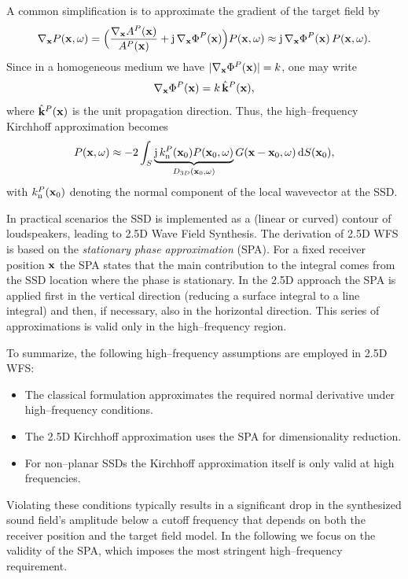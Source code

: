 \documentclass[11pt]{article}
\begin{document}
A common simplification is to approximate the gradient of the target field by
\begin{equation}
    \nabla_{\mathbf{x}}P(\mathbf{x},\omega) 
    = \Bigl(\frac{\nabla_{\mathbf{x}}A^P(\mathbf{x})}{A^P(\mathbf{x})} + \mathrm{j}\,\nabla_{\mathbf{x}}\Phi^P(\mathbf{x})\Bigr) P(\mathbf{x},\omega)
    \approx \mathrm{j}\,\nabla_{\mathbf{x}}\Phi^P(\mathbf{x})\,P(\mathbf{x},\omega).
\end{equation}
Since in a homogeneous medium we have \(|\nabla_{\mathbf{x}}\Phi^P(\mathbf{x})|=k\), one may write
\[
\nabla_{\mathbf{x}}\Phi^P(\mathbf{x})= k\,\hat{\mathbf{k}}^P(\mathbf{x}),
\]
where \(\hat{\mathbf{k}}^P(\mathbf{x})\) is the unit propagation direction. Thus, the high–frequency Kirchhoff approximation becomes
\begin{equation}
    P(\mathbf{x},\omega) \approx -2\int_S \underbrace{\mathrm{j}\,k^P_{\mathrm{n}}(\mathbf{x}_0)P(\mathbf{x}_0,\omega)}_{D_{3D}(\mathbf{x}_0,\omega)} G(\mathbf{x}-\mathbf{x}_0,\omega)\,\mathrm{d} S(\mathbf{x}_0),
\end{equation}
with \(k^P_{\mathrm{n}}(\mathbf{x}_0)\) denoting the normal component of the local wavevector at the SSD.

In practical scenarios the SSD is implemented as a (linear or curved) contour of loudspeakers, leading to 2.5D Wave Field Synthesis. The derivation of 2.5D WFS is based on the \emph{stationary phase approximation} (SPA). For a fixed receiver position \(\mathbf{x}\) the SPA states that the main contribution to the integral comes from the SSD location where the phase is stationary. In the 2.5D approach the SPA is applied first in the vertical direction (reducing a surface integral to a line integral) and then, if necessary, also in the horizontal direction. This series of approximations is valid only in the high–frequency region.

To summarize, the following high–frequency assumptions are employed in 2.5D WFS:
\begin{itemize}
    \item The classical formulation approximates the required normal derivative under high–frequency conditions.
    \item The 2.5D Kirchhoff approximation uses the SPA for dimensionality reduction.
    \item For non–planar SSDs the Kirchhoff approximation itself is only valid at high frequencies.
\end{itemize}
Violating these conditions typically results in a significant drop in the synthesized sound field’s amplitude below a cutoff frequency that depends on both the receiver position and the target field model. In the following we focus on the validity of the SPA, which imposes the most stringent high–frequency requirement.
\end{document}
